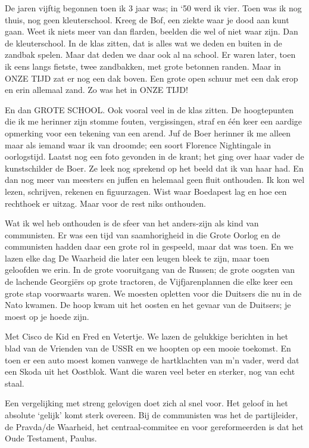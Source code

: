 \documentclass[10pt,twoside,openright]{memoir}
\begin{document}
De jaren vijftig begonnen toen ik 3 jaar was; in ‘50 werd ik vier. Toen was ik nog thuis, nog geen kleuterschool. Kreeg de Bof, een ziekte waar je dood aan kunt gaan. Weet ik niets meer van dan flarden, beelden die wel of niet waar zijn. Dan de kleuterschool. In de klas zitten, dat is alles wat we deden en buiten in de zandbak spelen. Maar dat deden we daar ook al na school. Er waren later, toen ik eens langs fietste, twee zandbakken, met grote betonnen randen. Maar in ONZE TIJD zat er nog een dak boven. Een grote open schuur met een dak erop en erin allemaal zand. Zo was het in ONZE TIJD!

En dan GROTE SCHOOL. Ook vooral veel in de klas zitten. De hoogtepunten die ik me herinner zijn stomme fouten, vergissingen, straf en één keer een aardige opmerking voor een tekening van een arend. Juf de Boer herinner ik me alleen maar als iemand waar ik van droomde; een soort Florence Nightingale in oorlogstijd. Laatst nog een foto gevonden in de krant; het ging over haar vader de kunstschilder de Boer. Ze leek nog sprekend op het beeld dat ik van haar had. En dan nog meer van meesters en juffen en helemaal geen fluit onthouden. Ik kon wel lezen, schrijven, rekenen en figuurzagen. Wist waar Boedapest lag en hoe een rechthoek er uitzag. Maar voor de rest niks onthouden.

Wat ik wel heb onthouden is de sfeer van het anders-zijn als kind van communisten. Er was een tijd van saamhorigheid in die Grote Oorlog en de communisten hadden daar een grote rol in gespeeld, maar dat was toen. En we lazen elke dag De Waarheid die later een leugen bleek te zijn, maar toen geloofden we erin. In de grote vooruitgang van de Russen; de grote oogsten van de lachende Georgiërs op grote tractoren, de Vijfjarenplannen die elke keer een grote stap voorwaarts waren. We moesten opletten voor die Duitsers die nu in de Nato kwamen. De hoop kwam uit het oosten en het gevaar van de Duitsers; je moest op je hoede zijn.

Met Cisco de Kid en Fred en Vetertje. We lazen de gelukkige berichten in het blad van de Vrienden van de USSR en we hoopten op een mooie toekomst. En toen er een auto moest komen vanwege de hartklachten van m’n vader, werd dat een Skoda uit het Oostblok. Want die waren veel beter en sterker, nog van echt staal. 

Een vergelijking met streng gelovigen doet zich al snel voor. Het geloof in het absolute ‘gelijk’ komt sterk overeen. Bij de communisten was het de partijleider, de Pravda/de Waarheid, het centraal-commitee en voor gereformeerden is dat het Oude Testament, Paulus. 
\end{document}
